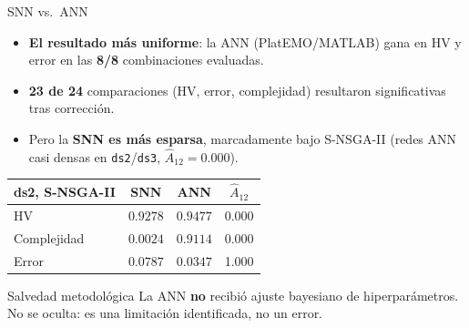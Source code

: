 \documentclass[aspectratio=169,10pt]{beamer}
\newcommand{\Atwelve}{\ensuremath{\hat{A}_{12}}}
\begin{document}
\begin{frame}{SNN vs.\ ANN}
  \small
  \begin{itemize}
    \item \textbf{El resultado más uniforme}: la ANN (PlatEMO/MATLAB) gana en HV y error en las \textbf{8/8} combinaciones evaluadas.
    \item \textbf{23 de 24} comparaciones (HV, error, complejidad) resultaron significativas tras corrección.
    \item Pero la \textbf{SNN es más esparsa}, marcadamente bajo S-NSGA-II (redes ANN casi densas en \texttt{ds2}/\texttt{ds3}, $\Atwelve=0.000$).
  \end{itemize}
  \vspace{-3pt}
  \begin{table}
  \centering\scriptsize
  \renewcommand{\arraystretch}{0.85}
  \begin{tabular}{lccc}
    \toprule
    \textbf{ds2, S-NSGA-II} & \textbf{SNN} & \textbf{ANN} & \Atwelve \\
    \midrule
    HV & $0.9278$ & $0.9477$ & 0.000 \\
    Complejidad & $0.0024$ & $0.9114$ & 0.000 \\
    Error & $0.0787$ & $0.0347$ & 1.000 \\
    \bottomrule
  \end{tabular}
  \end{table}
  \vspace{-3pt}
  \begin{alertblock}{Salvedad metodológica}
    \scriptsize La ANN \textbf{no} recibió ajuste bayesiano de hiperparámetros. No se oculta: es una limitación identificada, no un error.
  \end{alertblock}
\end{frame}
\end{document}

